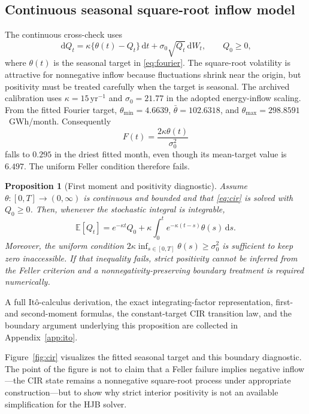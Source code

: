 \documentclass[11pt,a4paper]{article}
\newcommand{\E}{\mathbb{E}}
\newcommand{\dif}{\,\mathrm{d}}
\newtheorem{proposition}{Proposition}
\begin{document}
\subsection{Continuous seasonal square-root inflow model}\label{sec:cir}
The continuous cross-check uses
\begin{equation}
 \dif Q_t=\kappa\{\theta(t)-Q_t\}\dif t+\sigma_0\sqrt{Q_t}\dif W_t,
 \qquad Q_0\ge0,
 \label{eq:cir}
\end{equation}
where $\theta(t)$ is the seasonal target in \eqref{eq:fourier}. The square-root
volatility is attractive for nonnegative inflow because fluctuations shrink near
the origin, but positivity must be treated carefully when the target is
seasonal. The archived calibration uses $\kappa=15\,\mathrm{yr}^{-1}$ and
$\sigma_0=21.77$ in the adopted energy-inflow scaling. From the fitted Fourier
target, $\theta_{\min}=4.6639$, $\bar\theta=102.6318$, and
$\theta_{\max}=298.8591$~GWh/month. Consequently
\begin{equation}
 F(t)=\frac{2\kappa\theta(t)}{\sigma_0^2}
 \label{eq:feller-ratio}
\end{equation}
falls to $0.295$ in the driest fitted month, even though its mean-target value is
$6.497$. The uniform Feller condition therefore fails.

\begin{proposition}[First moment and positivity diagnostic]\label{prop:cir}
Assume $\theta:[0,T]\to(0,\infty)$ is continuous and bounded and that
\eqref{eq:cir} is solved with $Q_0\ge0$. Then, whenever the stochastic integral
is integrable,
\begin{equation}
 \E[Q_t]=e^{-\kappa t}Q_0+
 \kappa\int_0^t e^{-\kappa(t-s)}\theta(s)\dif s.
 \label{eq:first-moment}
\end{equation}
Moreover, the uniform condition
$2\kappa\inf_{s\in[0,T]}\theta(s)\ge\sigma_0^2$ is sufficient to keep zero
inaccessible. If that inequality fails, strict positivity cannot be inferred
from the Feller criterion and a nonnegativity-preserving boundary treatment is
required numerically.
\end{proposition}

\noindent A full It\^o-calculus derivation, the exact integrating-factor representation,
first- and second-moment formulas, the constant-target CIR transition law, and the
boundary argument underlying this proposition are collected in
Appendix~\ref{app:ito}.

Figure~\ref{fig:cir} visualizes the fitted seasonal target and this boundary
diagnostic. The point of the figure is not to claim that a Feller failure implies
negative inflow---the CIR state remains a nonnegative square-root process under
appropriate construction---but to show why strict interior positivity is not an
available simplification for the HJB solver.
\end{document}
